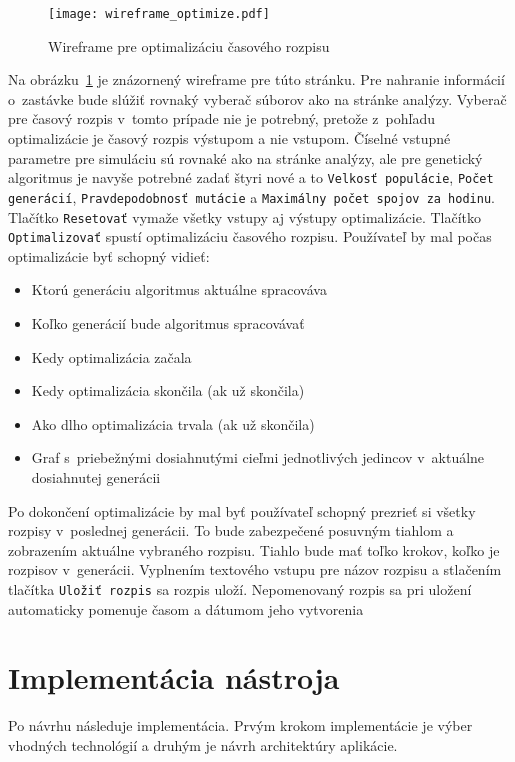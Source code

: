 \begin{figure}[h]\label{fig:wireframe_optimize}
  \centering
  \texttt{[image: wireframe\_optimize.pdf]}
  \caption{Wireframe pre optimalizáciu časového rozpisu}
\end{figure}

Na obrázku~\ref{fig:wireframe_optimize} je znázornený wireframe pre túto stránku.
Pre nahranie informácií o~zastávke bude slúžiť rovnaký vyberač súborov ako na stránke analýzy.
Vyberač pre časový rozpis v~tomto prípade nie je potrebný, pretože z~pohľadu optimalizácie je časový rozpis výstupom a nie vstupom.
Číselné vstupné parametre pre simuláciu sú rovnaké ako na stránke analýzy, ale pre genetický algoritmus je navyše potrebné zadať štyri nové a to \texttt{Velkosť populácie}, \texttt{Počet generácií}, \texttt{Pravdepodobnosť mutácie} a \texttt{Maximálny počet spojov za hodinu}.
Tlačítko \texttt{Resetovať} vymaže všetky vstupy aj výstupy optimalizácie.
Tlačítko \texttt{Optimalizovať} spustí optimalizáciu časového rozpisu.
Používateľ by mal počas optimalizácie byť schopný vidieť:
\begin{itemize}
  \item Ktorú generáciu algoritmus aktuálne spracováva
  \item Koľko generácií bude algoritmus spracovávať
  \item Kedy optimalizácia začala
  \item Kedy optimalizácia skončila (ak už skončila)
  \item Ako dlho optimalizácia trvala (ak už skončila)
  \item Graf s~priebežnými dosiahnutými cieľmi jednotlivých jedincov v~aktuálne dosiahnutej generácii
\end{itemize}
Po dokončení optimalizácie by mal byť používateľ schopný prezrieť si všetky rozpisy v~poslednej generácii.
To bude zabezpečené posuvným tiahlom a zobrazením aktuálne vybraného rozpisu.
Tiahlo bude mať toľko krokov, koľko je rozpisov v~generácii.
Vyplnením textového vstupu pre názov rozpisu a stlačením tlačítka \texttt{Uložiť rozpis} sa rozpis uloží.
Nepomenovaný rozpis sa pri uložení automaticky pomenuje časom a dátumom jeho vytvorenia %

\section{Implementácia nástroja}\label{nastroj_implementacia}

Po návrhu následuje implementácia.
Prvým krokom implementácie je výber vhodných technológií a druhým je návrh architektúry aplikácie.

